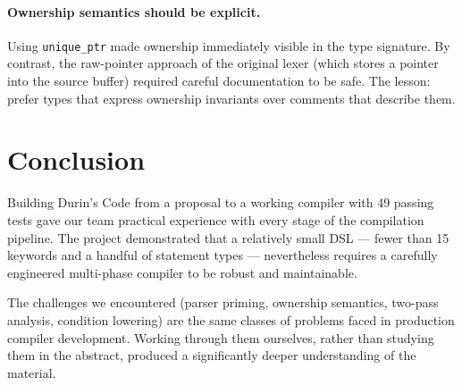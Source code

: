 \documentclass[12pt, a4paper]{article}
\begin{document}
\paragraph{Ownership semantics should be explicit.}
Using \texttt{unique\_ptr} made ownership immediately visible in the type signature.
By contrast, the raw-pointer approach of the original lexer (which stores a pointer
into the source buffer) required careful documentation to be safe.
The lesson: prefer types that express ownership invariants over comments that describe
them.

\section{Conclusion}

Building Durin's Code from a proposal to a working compiler with 49 passing tests
gave our team practical experience with every stage of the compilation pipeline.
The project demonstrated that a relatively small DSL --- fewer than 15 keywords
and a handful of statement types --- nevertheless requires a carefully engineered
multi-phase compiler to be robust and maintainable.

The challenges we encountered (parser priming, ownership semantics, two-pass analysis,
condition lowering) are the same classes of problems faced in production compiler
development.
Working through them ourselves, rather than studying them in the abstract, produced
a significantly deeper understanding of the material.
\end{document}
